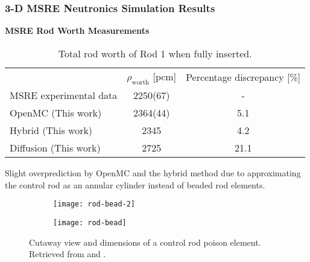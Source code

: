 \begin{frame}
  \frametitle{3-D MSRE Neutronics Simulation Results}
  \textbf{MSRE Rod Worth Measurements}
  \begin{table}[t]
    \centering
    \caption{Total rod worth of Rod 1 when fully inserted.}
    \small
    \begin{tabular}{l S[table-format=4(2)] S}
      \toprule
       & {$\rho_\text{worth}$ [pcm]} & {Percentage discrepancy [\%]}\\
       \cmidrule(rl){2-2} \cmidrule(l){3-3}
      \gls{MSRE} experimental data & 2250(67) & {-}\\
      OpenMC (This work) & 2364(44) & 5.1 \\
      Hybrid (This work) & 2345 & 4.2 \\
      Diffusion (This work) & 2725 & 21.1 \\
      \bottomrule
    \end{tabular}
    \label{table:rod-worth}
  \end{table}
  \vspace{.1cm}

  Slight overprediction by OpenMC and the hybrid method due to approximating the control rod
  as an annular cylinder instead of beaded rod elements.
  \begin{figure}[t]
    \begin{subfigure}[b]{0.22\columnwidth}
      \centering
      \texttt{[image: rod-bead-2]}
    \end{subfigure}
    \begin{subfigure}[b]{0.44\columnwidth}
      \centering
      \texttt{[image: rod-bead]}
    \end{subfigure}
    \caption{Cutaway view and dimensions of a control rod poison element. Retrieved from
    \cite{tolson_msre_1967} and \cite{robertson_msre_1965}.}
    \label{fig:rod-bead}
  \end{figure}
\end{frame}

